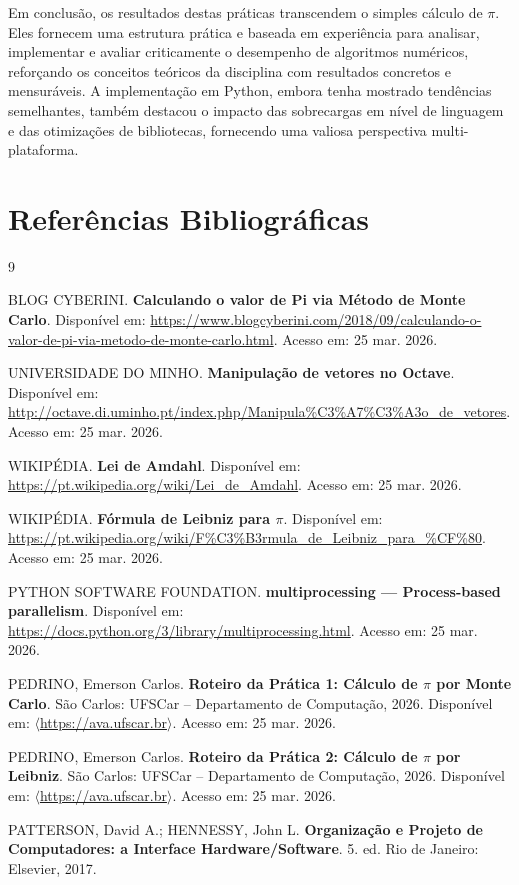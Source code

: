 \documentclass[12pt, a4paper]{article}
\begin{document}
	Em conclusão, os resultados destas práticas transcendem o simples cálculo de
	\(\pi\). Eles fornecem uma estrutura prática e baseada em experiência para
	analisar, implementar e avaliar criticamente o desempenho de algoritmos
	numéricos, reforçando os conceitos teóricos da disciplina com resultados
	concretos e mensuráveis. A implementação em Python, embora tenha mostrado
	tendências semelhantes, também destacou o impacto das sobrecargas em nível de
	linguagem e das otimizações de bibliotecas, fornecendo uma valiosa perspectiva
	multi-plataforma.
	
	\section{Referências Bibliográficas}
	
	\begin{thebibliography}{9}
		
		BLOG CYBERINI.
		\textbf{Calculando o valor de Pi via Método de Monte Carlo}.
		Disponível em: \url{https://www.blogcyberini.com/2018/09/calculando-o-valor-de-pi-via-metodo-de-monte-carlo.html}.
		Acesso em: 25 mar. 2026.
		
		UNIVERSIDADE DO MINHO.
		\textbf{Manipulação de vetores no Octave}.
		Disponível em: \url{http://octave.di.uminho.pt/index.php/Manipula%C3%A7%C3%A3o_de_vetores}.
		Acesso em: 25 mar. 2026.
		
		WIKIPÉDIA.
		\textbf{Lei de Amdahl}.
		Disponível em: \url{https://pt.wikipedia.org/wiki/Lei_de_Amdahl}.
		Acesso em: 25 mar. 2026.
		
		WIKIPÉDIA.
		\textbf{Fórmula de Leibniz para $\pi$}.
		Disponível em: \url{https://pt.wikipedia.org/wiki/F%C3%B3rmula_de_Leibniz_para_%CF%80}.
		Acesso em: 25 mar. 2026.
		
		PYTHON SOFTWARE FOUNDATION.
		\textbf{multiprocessing — Process-based parallelism}.
		Disponível em: \url{https://docs.python.org/3/library/multiprocessing.html}.
		Acesso em: 25 mar. 2026.
		
		PEDRINO, Emerson Carlos.
		\textbf{Roteiro da Prática 1: Cálculo de $\pi$ por Monte Carlo}.
		São Carlos: UFSCar -- Departamento de Computação, 2026.
		Disponível em: $\langle$\url{https://ava.ufscar.br}$\rangle$. Acesso em: 25 mar. 2026.
		
		PEDRINO, Emerson Carlos.
		\textbf{Roteiro da Prática 2: Cálculo de $\pi$ por Leibniz}.
		São Carlos: UFSCar -- Departamento de Computação, 2026.
		Disponível em: $\langle$\url{https://ava.ufscar.br}$\rangle$. Acesso em: 25 mar. 2026.
		
		PATTERSON, David A.; HENNESSY, John L.
		\textbf{Organização e Projeto de Computadores: a Interface Hardware/Software}.
		5. ed. Rio de Janeiro: Elsevier, 2017.
		
	\end{thebibliography}
	
\end{document}
